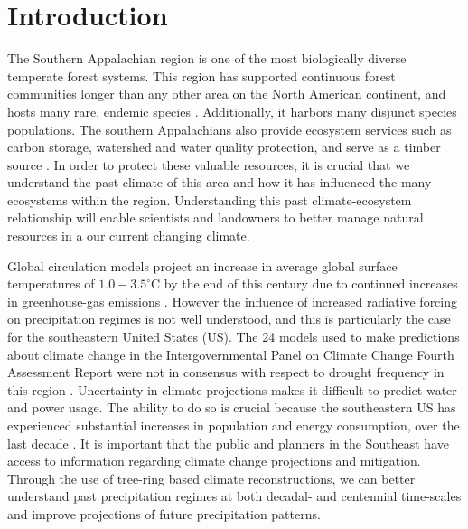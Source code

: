 \section{Introduction}


The Southern Appalachian region is one of the most biologically diverse
temperate forest systems.  This region has supported continuous forest
communities longer than any other area on the North American continent,
and hosts many rare, endemic species \cite{NCNHP2012}. Additionally,
it harbors many disjunct species populations. The southern
Appalachians also provide ecosystem services such as carbon storage,
watershed and water quality protection, and serve as a timber source
\cite{zipper2011restoring}. In order to protect these valuable resources,
it is crucial that we understand the past climate of this
area and how it has influenced the many ecosystems within the region.
Understanding this past climate-ecosystem relationship will enable scientists and landowners
to better manage natural resources in a our current changing climate.

Global circulation models project an increase in average global surface
temperatures of $1.0-3.5^{\circ}$C by the end of this century due to
continued increases in greenhouse-gas emissions \cite{IPCC2013,
kattenberg1996climate}. However the influence of increased radiative
forcing on precipitation regimes is not well understood, and this is
particularly the case for the southeastern United States (US). The
24 models used to make predictions about climate change in the
Intergovernmental Panel on Climate Change Fourth Assessment Report
were not in consensus with respect to drought frequency in this region
\cite{IPCC2013, seager2009drought}.  Uncertainty in climate
projections makes it difficult to predict water and power usage. The
ability to do so is crucial because the southeastern US has experienced
substantial increases in population and energy consumption, over the last
decade \cite{seager2009drought, sobolowski2012evaluation}. It is important
that the public and planners in the Southeast have access to information
regarding climate change projections and mitigation. Through the use of
tree-ring based climate reconstructions, we can better understand
past precipitation regimes at both decadal- and centennial time-scales and 
improve projections of future precipitation patterns.%


